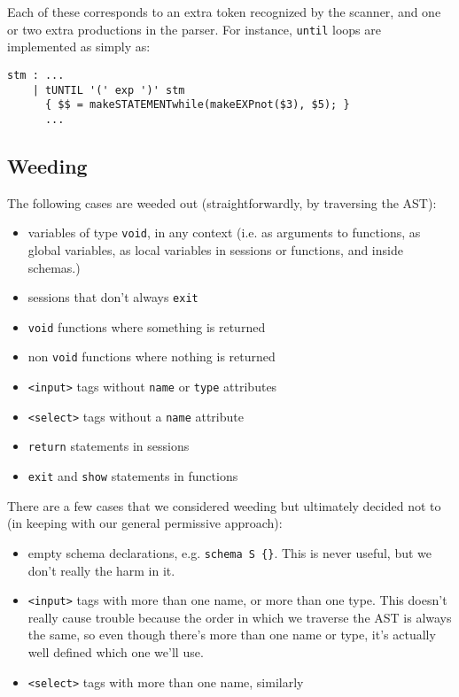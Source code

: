 \documentclass{WigReport}
\begin{document}
Each of these corresponds to an extra token recognized by the scanner,
and one or two extra productions in the parser. For instance, {\tt until}
loops are implemented as simply as:

\begin{verbatim}
stm : ...
    | tUNTIL '(' exp ')' stm
      { $$ = makeSTATEMENTwhile(makeEXPnot($3), $5); }
      ...
\end{verbatim}

\subsection{Weeding}
The following cases are weeded out (straightforwardly, by traversing the
AST):

\begin{itemize}
\item variables of type {\tt void}, in any context (i.e. as arguments to
functions, as global variables, as local variables in sessions or
functions, and inside schemas.)
\item sessions that don't always {\tt exit}
\item {\tt void} functions where something is returned
\item non {\tt void} functions where nothing is returned
\item {\tt <input>} tags without {\tt name} or {\tt type} attributes
\item {\tt <select>} tags without a {\tt name} attribute
\item {\tt return} statements in sessions
\item {\tt exit} and {\tt show} statements in functions
\end{itemize}

There are a few cases that we considered weeding but ultimately decided not
to (in keeping with our general permissive approach):

\begin{itemize}
\item empty schema declarations, e.g. {\tt schema S \{\}}. This is never
useful, but we don't really the harm in it.
\item {\tt <input>} tags with more than one name, or more than one type.
This doesn't really cause trouble because the order in which we traverse
the AST is always the same, so even though there's more than one name or
type, it's actually well defined which one we'll use.
\item {\tt <select>} tags with more than one name, similarly
\end{itemize}
\end{document}
